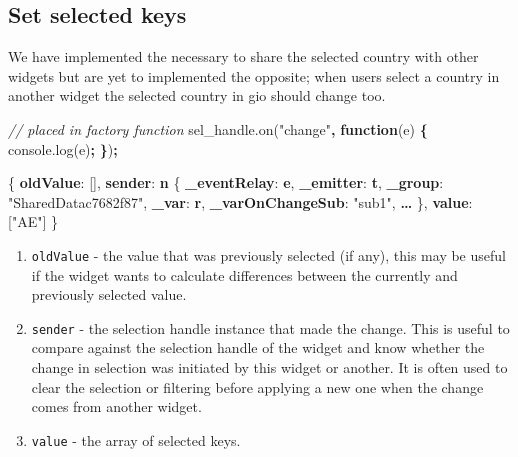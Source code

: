 \documentclass[
]{krantz}
\makeatletter
\newenvironment{Shaded}{\begin{snugshade}}{\end{snugshade}}
\newcommand{\AttributeTok}[1]{\textcolor[rgb]{0.61,0.61,0.61}{#1}}
\newcommand{\CommentTok}[1]{\textcolor[rgb]{0.37,0.37,0.37}{\textit{#1}}}
\newcommand{\ErrorTok}[1]{\textcolor[rgb]{0.14,0.14,0.14}{\textbf{#1}}}
\newcommand{\FunctionTok}[1]{\textcolor[rgb]{0,0,0}{#1}}
\newcommand{\KeywordTok}[1]{\textcolor[rgb]{0.27,0.27,0.27}{\textbf{#1}}}
\newcommand{\NormalTok}[1]{#1}
\newcommand{\OperatorTok}[1]{\textcolor[rgb]{0.43,0.43,0.43}{\textbf{#1}}}
\newcommand{\OtherTok}[1]{\textcolor[rgb]{0.37,0.37,0.37}{#1}}
\newcommand{\StringTok}[1]{\textcolor[rgb]{0.5,0.5,0.5}{#1}}
\newcommand{\VariableTok}[1]{\textcolor[rgb]{0,0,0}{#1}}
\providecommand{\tightlist}{%
  \setlength{\itemsep}{0pt}\setlength{\parskip}{0pt}}
\newenvironment{kframe}{%
\medskip{}
\setlength{\fboxsep}{.8em}
 \def\at@end@of@kframe{}%
 \ifinner\ifhmode%
  \def\at@end@of@kframe{\end{minipage}}%
  \begin{minipage}{\columnwidth}%
 \fi\fi%
 \def\FrameCommand##1{\hskip\@totalleftmargin \hskip-\fboxsep
 \colorbox{shadecolor}{##1}\hskip-\fboxsep
     \hskip-\linewidth \hskip-\@totalleftmargin \hskip\columnwidth}%
 \MakeFramed {\advance\hsize-\width
   \@totalleftmargin\z@ \linewidth\hsize
   \@setminipage}}%
 {\par\unskip\endMakeFramed%
 \at@end@of@kframe}
\renewenvironment{Shaded}{\begin{kframe}}{\end{kframe}}
\makeatother
\begin{document}
\hypertarget{set-selected-keys}{%
\subsection{Set selected keys}\label{set-selected-keys}}

We have implemented the necessary to share the selected country with other widgets but are yet to implemented the opposite; when users select a country in another widget the selected country in gio should change too.

\begin{Shaded}
\begin{Highlighting}[]
\CommentTok{// placed in factory function}
\VariableTok{sel\_handle}\NormalTok{.}\AttributeTok{on}\NormalTok{(}\StringTok{"change"}\OperatorTok{,} \KeywordTok{function}\NormalTok{(e) }\OperatorTok{\{}
  \VariableTok{console}\NormalTok{.}\AttributeTok{log}\NormalTok{(e)}\OperatorTok{;}
\OperatorTok{\}}\NormalTok{)}\OperatorTok{;}
\end{Highlighting}
\end{Shaded}

\begin{Shaded}
\begin{Highlighting}[]
\FunctionTok{\{}
  \ErrorTok{oldValue}\FunctionTok{:} \OtherTok{[]}\FunctionTok{,}
  \ErrorTok{sender}\FunctionTok{:} \ErrorTok{n} \FunctionTok{\{}
    \ErrorTok{\_eventRelay}\FunctionTok{:} \ErrorTok{e}\FunctionTok{,} 
    \ErrorTok{\_emitter}\FunctionTok{:} \ErrorTok{t}\FunctionTok{,} 
    \ErrorTok{\_group}\FunctionTok{:} \StringTok{"SharedDatac7682f87"}\FunctionTok{,} 
    \ErrorTok{\_var}\FunctionTok{:} \ErrorTok{r}\FunctionTok{,} 
    \ErrorTok{\_varOnChangeSub}\FunctionTok{:} \StringTok{"sub1"}\FunctionTok{,} 
    \ErrorTok{…}
  \FunctionTok{\},}
  \ErrorTok{value}\FunctionTok{:} \OtherTok{[}\StringTok{"AE"}\OtherTok{]}
\FunctionTok{\}}
\end{Highlighting}
\end{Shaded}

\begin{enumerate}
\def\labelenumi{\arabic{enumi}.}
\tightlist
\item
  \texttt{oldValue} - the value that was previously selected (if any), this may be useful if the widget wants to calculate differences between the currently and previously selected value.
\item
  \texttt{sender} - the selection handle instance that made the change. This is useful to compare against the selection handle of the widget and know whether the change in selection was initiated by this widget or another. It is often used to clear the selection or filtering before applying a new one when the change comes from another widget.
\item
  \texttt{value} - the array of selected keys.
\end{enumerate}
\end{document}
